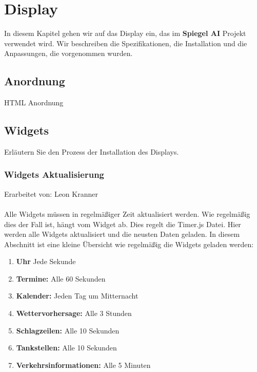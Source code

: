 \chapter{Display}

In diesem Kapitel gehen wir auf das Display ein, das im \textbf{Spiegel AI} Projekt verwendet wird. Wir beschreiben die Spezifikationen, die Installation und die Anpassungen, die vorgenommen wurden.

\section{Anordnung}
HTML Anordnung

\section{Widgets}
Erläutern Sie den Prozess der Installation des Displays.

\subsection{Widgets Aktualisierung}
Erarbeitet von: Leon Kranner \\ \\

Alle Widgets müssen in regelmäßiger Zeit aktualisiert werden. Wie regelmäßig dies der Fall ist, hängt vom Widget ab. Dies regelt die Timer.js Datei. Hier werden alle Widgets aktualisiert und die neusten Daten geladen. In diesem Abschnitt ist eine kleine Übersicht wie regelmäßig die Widgets geladen werden: \\

\begin{enumerate}
    \item \textbf{Uhr}
    Jede Sekunde
    
    \item \textbf{Termine:}
    Alle 60 Sekunden
    
    \item \textbf{Kalender:}
    Jeden Tag um Mitternacht
    
    \item \textbf{Wettervorhersage:}
    Alle 3 Stunden
    
    \item \textbf{Schlagzeilen:}
    Alle 10 Sekunden

 \item \textbf{Tankstellen:}
    Alle 10 Sekunden

 \item \textbf{Verkehrsinformationen:}
    Alle 5 Minuten
\end{enumerate}

